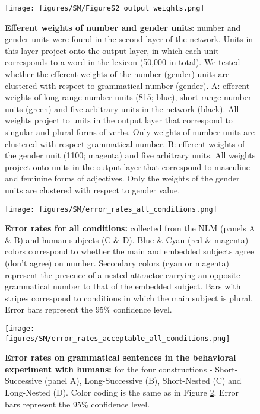 \begin{figure}
    \centering
    \texttt{[image: figures/SM/FigureS2\_output\_weights.png]}
    \caption{\textbf{Efferent weights of number and gender units}: number and gender units were found in the second layer of the network. Units in this layer project onto the output layer, in which each unit corresponds to a word in the lexicon (50,000 in total). We tested whether the efferent weights of the number (gender) units are clustered with respect to grammatical number (gender). A: efferent weights of long-range number units (815; blue), short-range number units (green) and five arbitrary units in the network (black). All weights project to units in the output layer that correspond to singular and plural forms of verbs. Only weights of number units are clustered with respect grammatical number. B: efferent weights of the gender unit (1100; magenta) and five arbitrary units. All weights project onto units in the output layer that correspond to masculine and feminine forms of adjectives. Only the weights of the gender units are clustered with respect to gender value.}
    \label{fig:efferent_weights}
\end{figure}

\begin{landscape}
\begin{figure}
    \centering
    \texttt{[image: figures/SM/error\_rates\_all\_conditions.png]}
    \caption{\textbf{Error rates for all conditions:} collected from the NLM (panels A \& B) and human subjects (C \& D). Blue \& Cyan (red \& magenta) colors correspond to whether the main and embedded subjects agree (don't agree) on number. Secondary colors (cyan or magenta) represent the presence of a nested attractor carrying an opposite grammatical number to that of the embedded subject. Bars with stripes correspond to conditions in which the main subject is plural. Error bars represent the 95\% confidence level.}
    \label{fig:error_rates_all_conditions}
\end{figure}
\end{landscape}

\begin{figure}[t]
    \centering
    \texttt{[image: figures/SM/error\_rates\_acceptable\_all\_conditions.png]}
    \caption{\textbf{Error rates on grammatical sentences in the behavioral experiment with humans:} for the four constructions - Short-Successive (panel A), Long-Successive (B), Short-Nested (C) and Long-Nested (D). Color coding is the same as in Figure \ref{fig:error_rates_all_conditions}. Error bars represent the 95\% confidence level.}
    \label{fig:error_rates_acceptable}
\end{figure}

